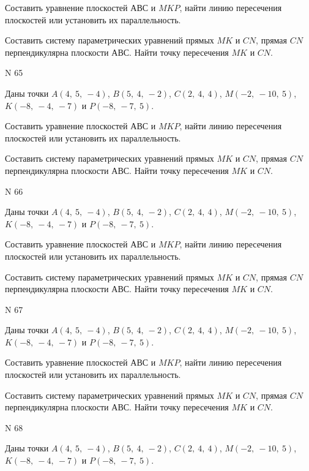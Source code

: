 \documentclass[11pt]{report}
\begin{document}
Составить уравнение плоскостей $АВС$ и $MKP$,
найти линию пересечения плоскостей или установить их параллельность.

Составить систему параметрических уравнений прямых $MK$ и $CN$,
прямая $CN$ перпендикулярна плоскости $АВС$. 
Найти точку пересечения $MK$ и $CN$.



 N 65

Даны точки $A\left( 4, \  5, \  -4\right)$, $B\left( 5, \  4, \  -2\right)$, $C\left( 2, \  4, \  4\right)$, $M\left( -2, \  -10, \  5\right)$, $K\left( -8, \  -4, \  -7\right)$ и $P\left( -8, \  -7, \  5\right)$.


Составить уравнение плоскостей $АВС$ и $MKP$,
найти линию пересечения плоскостей или установить их параллельность.

Составить систему параметрических уравнений прямых $MK$ и $CN$,
прямая $CN$ перпендикулярна плоскости $АВС$. 
Найти точку пересечения $MK$ и $CN$.



 N 66

Даны точки $A\left( 4, \  5, \  -4\right)$, $B\left( 5, \  4, \  -2\right)$, $C\left( 2, \  4, \  4\right)$, $M\left( -2, \  -10, \  5\right)$, $K\left( -8, \  -4, \  -7\right)$ и $P\left( -8, \  -7, \  5\right)$.


Составить уравнение плоскостей $АВС$ и $MKP$,
найти линию пересечения плоскостей или установить их параллельность.

Составить систему параметрических уравнений прямых $MK$ и $CN$,
прямая $CN$ перпендикулярна плоскости $АВС$. 
Найти точку пересечения $MK$ и $CN$.



 N 67

Даны точки $A\left( 4, \  5, \  -4\right)$, $B\left( 5, \  4, \  -2\right)$, $C\left( 2, \  4, \  4\right)$, $M\left( -2, \  -10, \  5\right)$, $K\left( -8, \  -4, \  -7\right)$ и $P\left( -8, \  -7, \  5\right)$.


Составить уравнение плоскостей $АВС$ и $MKP$,
найти линию пересечения плоскостей или установить их параллельность.

Составить систему параметрических уравнений прямых $MK$ и $CN$,
прямая $CN$ перпендикулярна плоскости $АВС$. 
Найти точку пересечения $MK$ и $CN$.



 N 68

Даны точки $A\left( 4, \  5, \  -4\right)$, $B\left( 5, \  4, \  -2\right)$, $C\left( 2, \  4, \  4\right)$, $M\left( -2, \  -10, \  5\right)$, $K\left( -8, \  -4, \  -7\right)$ и $P\left( -8, \  -7, \  5\right)$.
\end{document}
